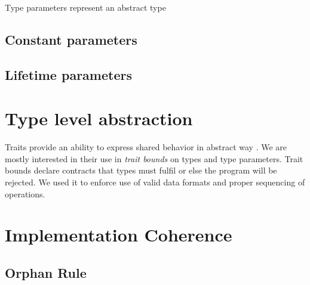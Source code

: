 Type parameters represent an abstract type 

\subsection{Constant parameters}


\subsection{Lifetime parameters}


\section{Type level abstraction}

Traits provide an ability to express shared behavior in abstract way \cite{rustbook}. We are mostly interested in their use in \textit{trait bounds} on types and type parameters.
Trait bounds declare contracts that types must fulfil or else the program will be rejected. 
We used it to enforce use of valid data formats and proper sequencing of operations.




\section{Implementation Coherence}

\subsection{Orphan Rule}